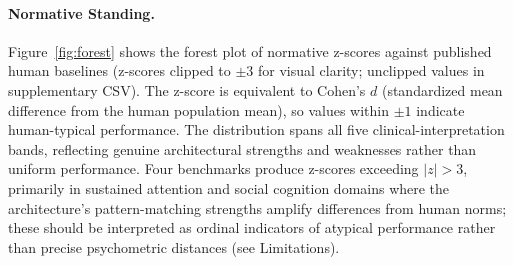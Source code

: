 \documentclass[11pt,letterpaper]{article}
\begin{document}
\paragraph{Normative Standing.} Figure~\ref{fig:forest} shows the forest plot of normative z-scores against published human baselines (z-scores clipped to $\pm 3$ for visual clarity; unclipped values in supplementary CSV). The z-score is equivalent to Cohen's $d$ (standardized mean difference from the human population mean), so values within $\pm 1$ indicate human-typical performance. The distribution spans all five clinical-interpretation bands, reflecting genuine architectural strengths and weaknesses rather than uniform performance. Four benchmarks produce z-scores exceeding $|z| > 3$, primarily in sustained attention and social cognition domains where the architecture's pattern-matching strengths amplify differences from human norms; these should be interpreted as ordinal indicators of atypical performance rather than precise psychometric distances (see Limitations).
\end{document}
